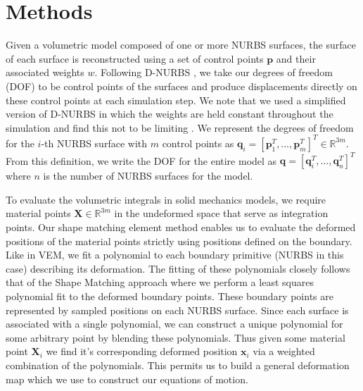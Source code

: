 

\section{Methods}
Given a volumetric model composed of one or more NURBS surfaces, the surface of each surface is reconstructed using a set of control points $\textbf{p}$ and their associated weights $w$. Following D-NURBS \cite{10.1145/176579.176580}, we take our degrees of freedom (DOF) to be control points of the surfaces and produce displacements directly on these control points at each simulation step. We note that we used a simplified version of D-NURBS in which the weights are held constant throughout the simulation and find this not to be limiting . We represent the degrees of freedom for the $i$-th NURBS surface with $m$ control points as $\mathbf{q}_i = \left[ \mathbf{p}_1^T, \dots, \mathbf{p}_m^T \right]^T \in \mathbb{R}^{3m}$. From this definition, we write the DOF for the entire model as $\mathbf{q} = \left[ \mathbf{q}_i^T, \dots, \mathbf{q}_n^T \right]^T$ where $n$ is the number of NURBS surfaces for the model. 

To evaluate the volumetric integrals in solid mechanics models, we require material points $\mathbf{X} \in \mathbb{R}^{3m}$ in the undeformed space that serve as integration points. Our shape matching element method enables us to evaluate the deformed positions of the material points strictly using positions defined on the boundary. Like in VEM, we fit a polynomial to each boundary primitive (NURBS in this case) describing its deformation. The fitting of these polynomials closely follows that of the Shape Matching \cite{10.1145/1073204.1073216} approach where we perform a least squares polynomial fit to the deformed boundary points. These boundary points are represented by sampled positions on each NURBS surface. Since each surface is associated with a single polynomial, we can construct a unique polynomial for some arbitrary point by blending these polynomials. Thus given some material point $\mathbf{X}_i$ we find it's corresponding deformed position $\mathbf{x}_i$ via a weighted combination of the polynomials. This permits us to build a general deformation map which we use to construct our equations of motion.

